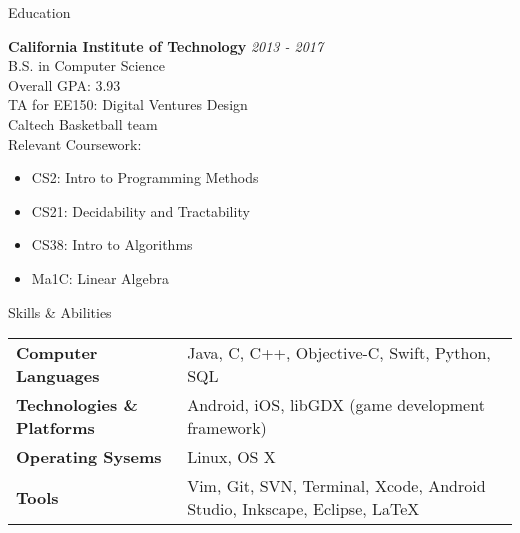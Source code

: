 \documentclass{resume} %
\begin{document}

\begin{rSection}{Education}

{\bf California Institute of Technology} \hfill {\em 2013 - 2017} \\
B.S. in Computer Science \smallskip \\
Overall GPA: 3.93 \\
TA for EE150: Digital Ventures Design \\
Caltech Basketball team \smallskip \\
Relevant Coursework:
\vspace{-5.0mm}
\begin{minipage}{0.4\linewidth}
\begin{itemize}
\item{CS2: Intro to Programming Methods}
\item{CS21: Decidability and Tractability}
\end{itemize}
\end{minipage}
\begin{minipage}{0.4\linewidth}
\begin{itemize}
\item{CS38: Intro to Algorithms}
\item{Ma1C: Linear Algebra}
\end{itemize}
\end{minipage}
\vspace{2mm}
\end{rSection}


\begin{rSection}{Skills \& Abilities}

\begin{tabularx}{\textwidth}{@{}lX}
    \bfseries{Computer Languages}   &  Java, C, C++, Objective-C, Swift, Python,
    SQL \\
    \bfseries{Technologies \& Platforms}   &  Android, iOS, libGDX (game development
    framework) \\
    \bfseries{Operating Sysems}   &  Linux, OS X \\
    \bfseries{Tools}   &  Vim, Git, SVN, Terminal, Xcode, Android Studio, Inkscape,
    Eclipse, \LaTeX \\
\end{tabularx}

\end{rSection}
\end{document}
